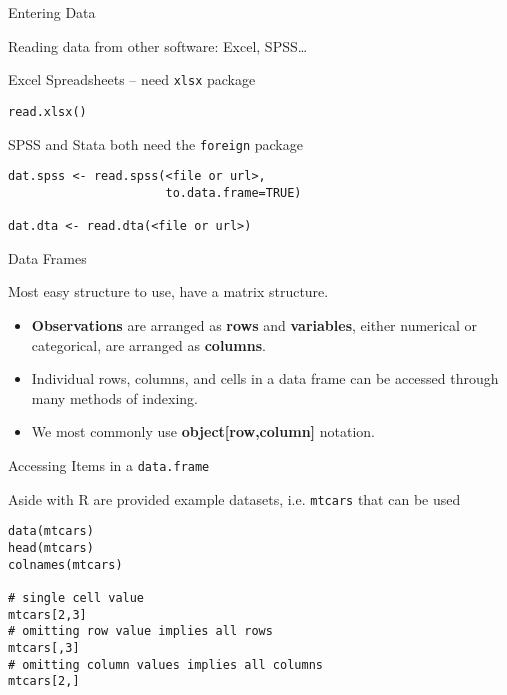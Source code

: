 \begin{frame}[fragile]{Entering Data}

\begin{block}{Reading data from other software: Excel, SPSS\ldots{}}

Excel Spreadsheets -- need \texttt{xlsx} package

\begin{verbatim}
read.xlsx()
\end{verbatim}

SPSS and Stata both need the \texttt{foreign} package

\begin{verbatim}
dat.spss <- read.spss(<file or url>, 
                      to.data.frame=TRUE)
             
dat.dta <- read.dta(<file or url>)
\end{verbatim}

\end{block}

\end{frame}

\begin{frame}{Data Frames}

Most easy structure to use, have a matrix structure.

\begin{itemize}
\item
  \textbf{Observations} are arranged as \textbf{rows} and
  \textbf{variables}, either numerical or categorical, are arranged as
  \textbf{columns}.
\item
  Individual rows, columns, and cells in a data frame can be accessed
  through many methods of indexing.
\item
  We most commonly use \textbf{object{[}row,column{]}} notation.
\end{itemize}

\end{frame}

\begin{frame}[fragile]{Accessing Items in a \texttt{data.frame}}

Aside with R are provided example datasets, i.e. \texttt{mtcars} that
can be used

\begin{verbatim}
data(mtcars)
head(mtcars)
colnames(mtcars)

# single cell value
mtcars[2,3]
# omitting row value implies all rows
mtcars[,3]
# omitting column values implies all columns
mtcars[2,]
\end{verbatim}

\end{frame}

